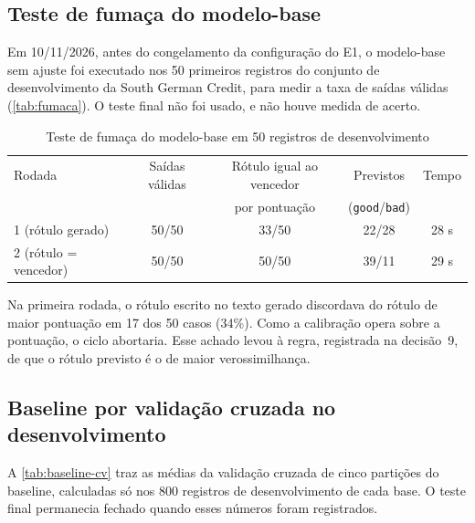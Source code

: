 \subsection{Teste de fumaça do modelo-base}
\label{sec:fumaca}

Em 10/11/2026, antes do congelamento da configuração do E1, o modelo-base sem ajuste foi executado nos 50 primeiros registros do conjunto de desenvolvimento da South German Credit, para medir a taxa de saídas válidas (\autoref{tab:fumaca}). O teste final não foi usado, e não houve medida de acerto.

\begin{table}[htb]
  \centering
  \caption{Teste de fumaça do modelo-base em 50 registros de desenvolvimento}
  \label{tab:fumaca}
  \small
  \begin{tabular}{lcccc}
    \toprule
    Rodada & Saídas válidas & Rótulo igual ao vencedor & Previstos & Tempo \\
    & & por pontuação & (\texttt{good}/\texttt{bad}) & \\
    \midrule
    1 (rótulo gerado) & 50/50 & 33/50 & 22/28 & 28 s \\
    2 (rótulo = vencedor) & 50/50 & 50/50 & 39/11 & 29 s \\
    \bottomrule
  \end{tabular}
\end{table}

Na primeira rodada, o rótulo escrito no texto gerado discordava do rótulo de maior pontuação em 17 dos 50 casos (34\%). Como a calibração opera sobre a pontuação, o ciclo abortaria. Esse achado levou à regra, registrada na decisão~9, de que o rótulo previsto é o de maior verossimilhança.

\subsection{Baseline por validação cruzada no desenvolvimento}

A \autoref{tab:baseline-cv} traz as médias da validação cruzada de cinco partições do baseline, calculadas só nos 800 registros de desenvolvimento de cada base. O teste final permanecia fechado quando esses números foram registrados.

